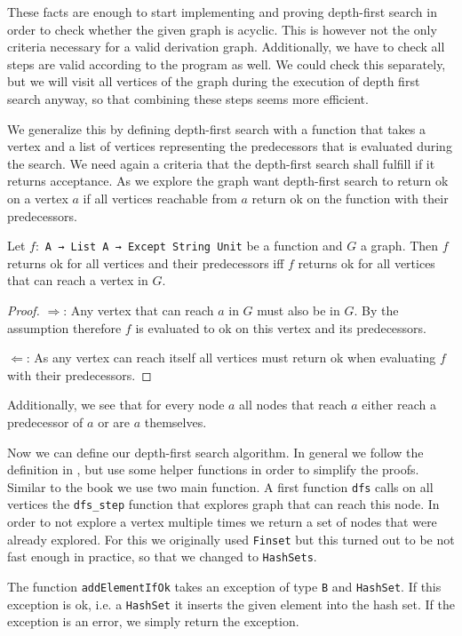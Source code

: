 These facts are enough to start implementing and proving depth-first search in order to check whether the given graph is acyclic. This is however not the only criteria necessary for a valid derivation graph. Additionally, we have to check all steps are valid according to the program as well. We could check this separately, but we will visit all vertices of the graph during the execution of depth first search anyway, so that combining these steps seems more efficient. 

We generalize this by defining depth-first search with a function that takes a vertex and a list of vertices representing the predecessors that is evaluated during the search. We need again a criteria that the depth-first search shall fulfill if it returns acceptance. As we explore the graph want depth-first search to return ok on a vertex $a$ if all vertices reachable from $a$ return ok on the function with their predecessors.

\begin{lemma}
    Let $f:$ \texttt{A → List A → Except String Unit} be a function and $G$ a graph. Then $f$ returns ok for all vertices and their predecessors iff $f$ returns ok for all vertices that can reach a vertex in $G$. 
\end{lemma}
\begin{proof}
    $\Rightarrow$: Any vertex that can reach $a$ in $G$ must also be in $G$. By the assumption therefore $f$ is evaluated to ok on this vertex and its predecessors.

    $\Leftarrow$: As any vertex can reach itself all vertices must return ok when evaluating $f$ with their predecessors.
\end{proof}

Additionally, we see that for every node $a$ all nodes that reach $a$ either reach a predecessor of $a$ or are $a$ themselves.

Now we can define our depth-first search algorithm. In general we follow the definition in \cite{AlgorithmsBook}, but use some helper functions in order to simplify the proofs. Similar to the book we use two main function. A first function \texttt{dfs} calls on all vertices the \texttt{dfs\_step} function that explores graph that can reach this node. In order to not explore a vertex multiple times we return a set of nodes that were already explored. For this we originally used \texttt{Finset} but this turned out to be not fast enough in practice, so that we changed to \texttt{HashSets}.

The function \texttt{addElementIfOk} takes an exception of type \texttt{B} and \texttt{HashSet}. If this exception is ok, i.e. a \texttt{HashSet} it inserts the given element into the hash set. If the exception is an error, we simply return the exception.


